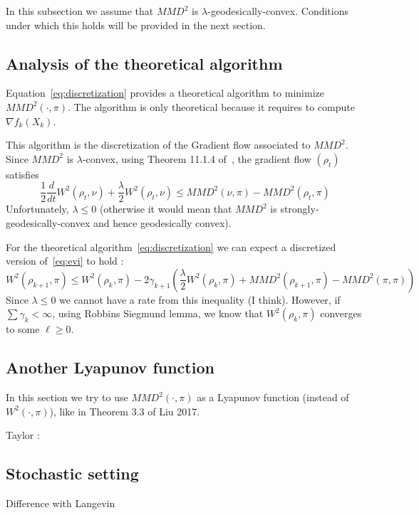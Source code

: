 In this subsection we assume that $MMD^2$ is $\lambda$-geodesically-convex. Conditions under which this holds will be provided in the next section.

\subsection{Analysis of the theoretical algorithm}

Equation~\eqref{eq:discretization} provides a theoretical algorithm to minimize $MMD^2(\cdot,\pi)$. The algorithm is only theoretical because it requires to compute $\nabla f_k(X_k)$.

This algorithm is the discretization of the Gradient flow associated to $MMD^2$. Since $MMD^2$ is $\lambda$-convex, using Theorem 11.1.4 of~\cite{ambrosio}, the gradient flow $(\rho_t)$ satisfies
\begin{equation}
    \label{eq:evi}
    \frac12 \frac{d}{dt} W^2(\rho_t,\nu) + \frac{\lambda}{2}W^2(\rho_t,\nu) \leq MMD^2(\nu,\pi) - MMD^2(\rho_t,\pi)
\end{equation}
Unfortunately, $\lambda \leq 0$ (otherwise it would mean that $MMD^2$ is strongly-geodesically-convex and hence geodesically convex).

For the theoretical algorithm~\eqref{eq:discretization} we can expect a discretized version of~\eqref{eq:evi} to hold : 
\begin{equation}
    \label{eq:evi-discrete}
    W^2(\rho_{k+1},\pi) \leq  W^2(\rho_{k},\pi) -2\gamma_{k+1}\left( \frac{\lambda}{2}W^2(\rho_{k},\pi) + MMD^2(\rho_{k+1},\pi) - MMD^2(\pi,\pi)\right)
\end{equation}
Since $\lambda \leq 0$ we cannot have a rate from this inequality (I think).
However, if $\sum \gamma_k < \infty$, using Robbins Siegmund lemma, we know that $W^2(\rho_{k},\pi)$ converges to some $\ell \geq 0$. 

\subsection{Another Lyapunov function}

In this section we try to use $MMD^2(\cdot,\pi)$ as a Lyapunov function (instead of $W^2(\cdot,\pi)$), like in Theorem 3.3 of Liu 2017.

Taylor : 


\subsection{Stochastic setting}

Difference with Langevin

